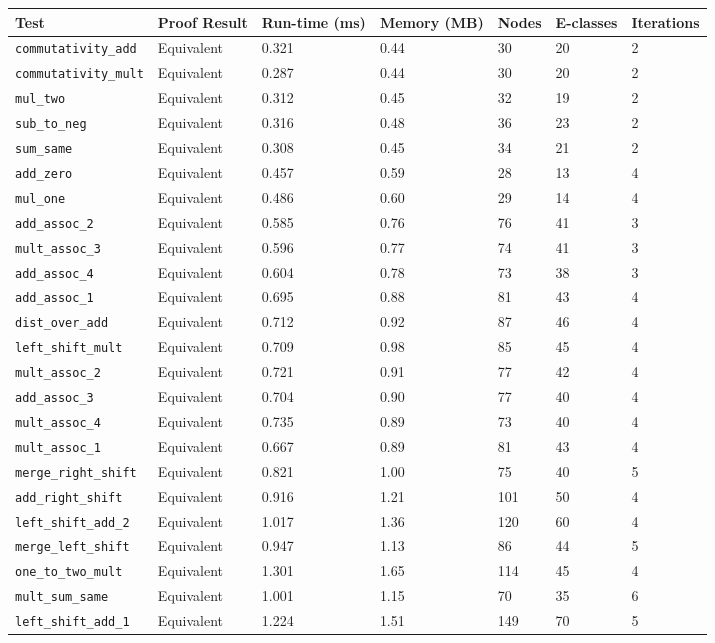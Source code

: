 \begin{tabular}{lllllll}
\toprule
\textbf{Test} & \textbf{Proof Result} & \textbf{Run-time (ms)} & \textbf{Memory (MB)} & \textbf{Nodes} & \textbf{E-classes} & \textbf{Iterations} \\
\midrule
\texttt{commutativity\_add} & Equivalent & 0.321 & 0.44 & 30 & 20 & 2 \\
\texttt{commutativity\_mult} & Equivalent & 0.287 & 0.44 & 30 & 20 & 2 \\
\texttt{mul\_two} & Equivalent & 0.312 & 0.45 & 32 & 19 & 2 \\
\texttt{sub\_to\_neg} & Equivalent & 0.316 & 0.48 & 36 & 23 & 2 \\
\texttt{sum\_same} & Equivalent & 0.308 & 0.45 & 34 & 21 & 2 \\
\texttt{add\_zero} & Equivalent & 0.457 & 0.59 & 28 & 13 & 4 \\
\texttt{mul\_one} & Equivalent & 0.486 & 0.60 & 29 & 14 & 4 \\
\texttt{add\_assoc\_2} & Equivalent & 0.585 & 0.76 & 76 & 41 & 3 \\
\texttt{mult\_assoc\_3} & Equivalent & 0.596 & 0.77 & 74 & 41 & 3 \\
\texttt{add\_assoc\_4} & Equivalent & 0.604 & 0.78 & 73 & 38 & 3 \\
\texttt{add\_assoc\_1} & Equivalent & 0.695 & 0.88 & 81 & 43 & 4 \\
\texttt{dist\_over\_add} & Equivalent & 0.712 & 0.92 & 87 & 46 & 4 \\
\texttt{left\_shift\_mult} & Equivalent & 0.709 & 0.98 & 85 & 45 & 4 \\
\texttt{mult\_assoc\_2} & Equivalent & 0.721 & 0.91 & 77 & 42 & 4 \\
\texttt{add\_assoc\_3} & Equivalent & 0.704 & 0.90 & 77 & 40 & 4 \\
\texttt{mult\_assoc\_4} & Equivalent & 0.735 & 0.89 & 73 & 40 & 4 \\
\texttt{mult\_assoc\_1} & Equivalent & 0.667 & 0.89 & 81 & 43 & 4 \\
\texttt{merge\_right\_shift} & Equivalent & 0.821 & 1.00 & 75 & 40 & 5 \\
\texttt{add\_right\_shift} & Equivalent & 0.916 & 1.21 & 101 & 50 & 4 \\
\texttt{left\_shift\_add\_2} & Equivalent & 1.017 & 1.36 & 120 & 60 & 4 \\
\texttt{merge\_left\_shift} & Equivalent & 0.947 & 1.13 & 86 & 44 & 5 \\
\texttt{one\_to\_two\_mult} & Equivalent & 1.301 & 1.65 & 114 & 45 & 4 \\
\texttt{mult\_sum\_same} & Equivalent & 1.001 & 1.15 & 70 & 35 & 6 \\
\texttt{left\_shift\_add\_1} & Equivalent & 1.224 & 1.51 & 149 & 70 & 5 \\
\bottomrule
\end{tabular}
